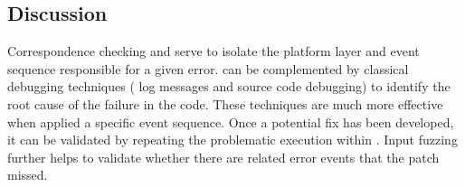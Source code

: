 \subsection{Discussion}

Correspondence checking and \simulator{} serve to isolate the platform layer and
event sequence responsible for a given error. \projectname{} can be
complemented by classical debugging techniques (\eg{} log messages and source
code debugging) to identify the root cause of
the failure in the code. These techniques are much more
effective when applied a specific event sequence. Once a
potential fix has been developed, it can be validated by repeating the
problematic execution within \projectname{}. Input fuzzing further helps to
validate whether there are
related error events that the patch missed.

